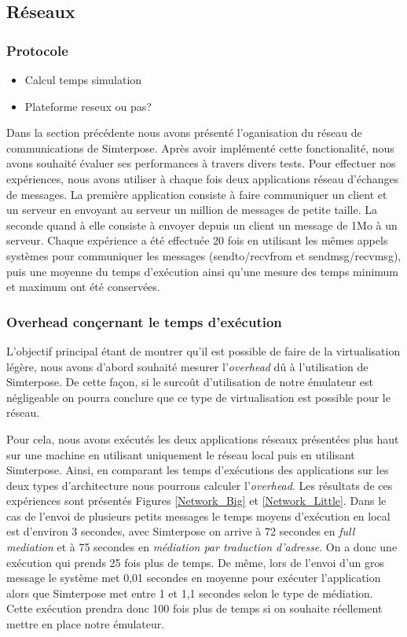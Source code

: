 \subsection{Réseaux}
\label{subsection:res}
\subsubsection{Protocole}
\begin{itemize}
  \item Calcul temps simulation
  \item Plateforme reseux ou pas?
\end{itemize}

Dans la section précédente nous avons présenté l'oganisation du réseau de communications de Simterpose. Après avoir implémenté cette fonctionalité, nous avons souhaité évaluer ses performances à travers divers tests. Pour effectuer nos expériences, nous avons utiliser à chaque fois deux applications réseau d'échanges de messages. La première application consiste à faire communiquer un client et un serveur en envoyant au serveur un million de messages de petite taille. La seconde quand à elle consiste à envoyer depuis un client un message de 1Mo à un serveur. Chaque expérience a été effectuée 20 fois en utilisant les mêmes appels systèmes pour communiquer les messages ({\color{red}sendto/recvfrom et sendmsg/recvmsg}), puis une moyenne du temps d'exécution ainsi qu'une mesure des temps minimum et maximum ont été conservées.

\subsubsection{Overhead conçernant le temps d'exécution}
L'objectif principal étant de montrer qu'il est possible de faire de la virtualisation légère, nous avons d'abord souhaité mesurer l'\textit{overhead} dû à l'utilisation de Simterpose. De cette façon, si le surcoût d'utilisation de notre émulateur est négligeable on pourra conclure que ce type de virtualisation est possible pour le réseau.

Pour cela, nous avons exécutés les deux applications réseaux présentées plus haut sur une machine en utilisant uniquement le réseau local puis en utilisant Simterpose. Ainsi, en comparant les temps d'exécutions des applications sur les deux types d'architecture nous pourrons calculer l'\textit{overhead}. Les résultats de ces expériences sont présentés Figures \ref{Network_Big} et \ref{Network_Little}. Dans le cas de l'envoi de plusieurs petits messages le temps moyens d'exécution en local est d'environ 3 secondes, avec Simterpose on arrive à 72 secondes en \textit{full mediation} et à 75 secondes en \textit{médiation par traduction d'adresse}. On a donc une exécution qui prends 25 fois plus de temps. De même, lors de l'envoi d'un gros message le système met 0,01 secondes en moyenne pour exécuter l'application alors que Simterpose met entre 1 et 1,1 secondes selon le type de médiation. Cette exécution prendra donc 100 fois plus de temps si on souhaite réellement mettre en place notre émulateur.

